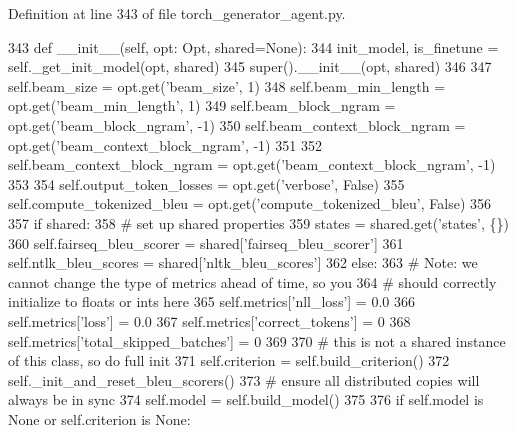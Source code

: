 Definition at line 343 of file torch\+\_\+generator\+\_\+agent.\+py.


\begin{DoxyCode}
343     \textcolor{keyword}{def }\_\_init\_\_(self, opt: Opt, shared=\textcolor{keywordtype}{None}):
344         init\_model, is\_finetune = self.\_get\_init\_model(opt, shared)
345         super().\_\_init\_\_(opt, shared)
346 
347         self.beam\_size = opt.get(\textcolor{stringliteral}{'beam\_size'}, 1)
348         self.beam\_min\_length = opt.get(\textcolor{stringliteral}{'beam\_min\_length'}, 1)
349         self.beam\_block\_ngram = opt.get(\textcolor{stringliteral}{'beam\_block\_ngram'}, -1)
350         self.beam\_context\_block\_ngram = opt.get(\textcolor{stringliteral}{'beam\_context\_block\_ngram'}, -1)
351 
352         self.beam\_context\_block\_ngram = opt.get(\textcolor{stringliteral}{'beam\_context\_block\_ngram'}, -1)
353 
354         self.output\_token\_losses = opt.get(\textcolor{stringliteral}{'verbose'}, \textcolor{keyword}{False})
355         self.compute\_tokenized\_bleu = opt.get(\textcolor{stringliteral}{'compute\_tokenized\_bleu'}, \textcolor{keyword}{False})
356 
357         \textcolor{keywordflow}{if} shared:
358             \textcolor{comment}{# set up shared properties}
359             states = shared.get(\textcolor{stringliteral}{'states'}, \{\})
360             self.fairseq\_bleu\_scorer = shared[\textcolor{stringliteral}{'fairseq\_bleu\_scorer'}]
361             self.ntlk\_bleu\_scores = shared[\textcolor{stringliteral}{'nltk\_bleu\_scores'}]
362         \textcolor{keywordflow}{else}:
363             \textcolor{comment}{# Note: we cannot change the type of metrics ahead of time, so you}
364             \textcolor{comment}{# should correctly initialize to floats or ints here}
365             self.metrics[\textcolor{stringliteral}{'nll\_loss'}] = 0.0
366             self.metrics[\textcolor{stringliteral}{'loss'}] = 0.0
367             self.metrics[\textcolor{stringliteral}{'correct\_tokens'}] = 0
368             self.metrics[\textcolor{stringliteral}{'total\_skipped\_batches'}] = 0
369 
370             \textcolor{comment}{# this is not a shared instance of this class, so do full init}
371             self.criterion = self.build\_criterion()
372             self.\_init\_and\_reset\_bleu\_scorers()
373             \textcolor{comment}{# ensure all distributed copies will always be in sync}
374             self.model = self.build\_model()
375 
376             \textcolor{keywordflow}{if} self.model \textcolor{keywordflow}{is} \textcolor{keywordtype}{None} \textcolor{keywordflow}{or} self.criterion \textcolor{keywordflow}{is} \textcolor{keywordtype}{None}:

\end{DoxyCode}
